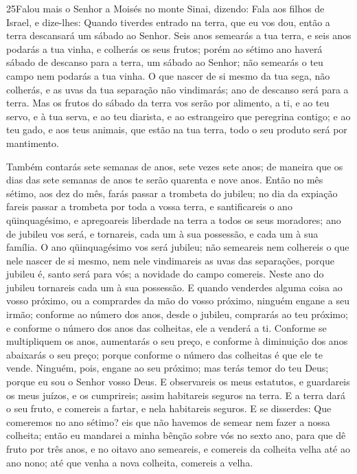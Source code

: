 \medskip

\lettrine{25} Falou mais o Senhor a Moisés no monte Sinai,
dizendo: Fala aos filhos de Israel, e dize-lhes: Quando tiverdes
entrado na terra, que eu vos dou, então a terra descansará um sábado
ao Senhor. Seis anos semearás a tua terra, e seis anos podarás a
tua vinha, e colherás os seus frutos; porém ao sétimo ano haverá
sábado de descanso para a terra, um sábado ao Senhor; não semearás o
teu campo nem podarás a tua vinha. O que nascer de si mesmo da
tua sega, não colherás, e as uvas da tua separação não vindimarás;
ano de descanso será para a terra. Mas os frutos do sábado da
terra vos serão por alimento, a ti, e ao teu servo, e à tua serva, e
ao teu diarista, e ao estrangeiro que peregrina contigo; e ao
teu gado, e aos teus animais, que estão na tua terra, todo o seu
produto será por mantimento.

Também contarás sete semanas de anos, sete vezes sete anos; de
maneira que os dias das sete semanas de anos te serão quarenta e
nove anos. Então no mês sétimo, aos dez do mês, farás passar a
trombeta do jubileu; no dia da expiação fareis passar a trombeta por
toda a vossa terra, e santificareis o ano qüinquagésimo, e
apregoareis liberdade na terra a todos os seus moradores; ano de
jubileu vos será, e tornareis, cada um à sua possessão, e cada um à
sua família. O ano qüinquagésimo vos será jubileu; não
semeareis nem colhereis o que nele nascer de si mesmo, nem nele
vindimareis as uvas das separações, porque jubileu é, santo
será para vós; a novidade do campo comereis. Neste ano do
jubileu tornareis cada um à sua possessão. E quando venderdes
alguma coisa ao vosso próximo, ou a comprardes da mão do vosso
próximo, ninguém engane a seu irmão; conforme ao número dos
anos, desde o jubileu, comprarás ao teu próximo; e conforme o número
dos anos das colheitas, ele a venderá a ti. Conforme se
multipliquem os anos, aumentarás o seu preço, e conforme à
diminuição dos anos abaixarás o seu preço; porque conforme o número
das colheitas é que ele te vende. Ninguém, pois, engane ao
seu próximo; mas terás temor do teu Deus; porque eu sou o Senhor
vosso Deus. E observareis os meus estatutos, e guardareis os
meus juízos, e os cumprireis; assim habitareis seguros na terra.
E a terra dará o seu fruto, e comereis a fartar, e nela
habitareis seguros. E se disserdes: Que comeremos no ano
sétimo? eis que não havemos de semear nem fazer a nossa colheita;
então eu mandarei a minha bênção sobre vós no sexto ano, para
que dê fruto por três anos, e no oitavo ano semeareis, e
comereis da colheita velha até ao ano nono; até que venha a nova
colheita, comereis a velha.

